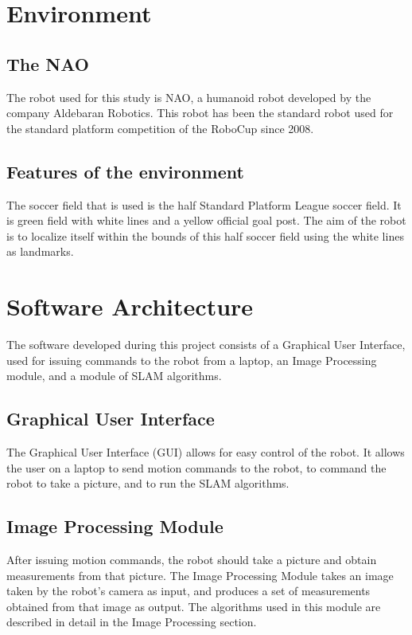\documentclass{ba-kecs}
\numberwithin{figure}{section}
\numberwithin{equation}{section}
\begin{document}

\section{Environment}
\subsection{The NAO}
The robot used for this study is NAO, a humanoid robot developed by the company Aldebaran Robotics. This robot has been the standard robot used for the standard platform competition of the RoboCup since 2008.


\subsection{Features of the environment}
The soccer field that is used is the half Standard Platform League soccer field. It is green field with white lines and a yellow official goal post. The aim of the robot is to localize itself within the bounds of this half soccer field using the white lines as landmarks.


\section{Software Architecture}
The software developed during this project consists of a Graphical User Interface, used for issuing commands to the robot from a laptop, an Image Processing module, and a module of SLAM algorithms.

\subsection{Graphical User Interface}
The Graphical User Interface (GUI) allows for easy control of the robot. It allows the user on a laptop to send motion commands to the robot, to command the robot to take a picture, and to run the SLAM algorithms.

\subsection{Image Processing Module}
After issuing motion commands, the robot should take a picture and obtain measurements from that picture. The Image Processing Module takes an image taken by the robot's camera as input, and produces a set of measurements obtained from that image as output. The algorithms used in this module are described in detail in the Image Processing section.
\end{document}
